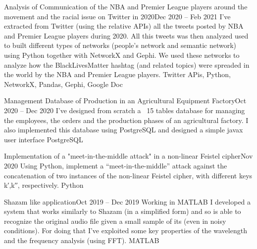 \begin{projects}
    	
    	
    \projectNoLink
    	{Analysis of Communication of the NBA and Premier League players around the movement and the racial issue on Twitter in 2020}{Dec 2020 – Feb 2021}
    	{I've extracted from Twitter (using the relative APIs) all the tweets posted by NBA and Premier League players during 2020. All this tweets was then analyzed used to built different types of networks (people's network and semantic network) using Python together with NetworkX and Gephi. We used these networks to analyze how the BlackLivesMatter hashtag (and related topics) were spreaded in the world by the NBA and Premier League players.}
    	{Twitter APis, Python, NetworkX, Pandas, Gephi, Google Doc}
    	
    \projectNoLink
    	{Management Database of Production in an Agricultural Equipment Factory}{Oct 2020 – Dec 2020}
    	{I've designed from scratch a ~15 tables database for managing the employees, the orders and the production phases of an agricultural factory. I also implemented this database using PostgreSQL and designed a simple javax user interface}
    	{PostgreSQL}
    	
    \projectNoLink
    	{Implementation of a "meet-in-the-middle attack" in a non-linear Feistel cipher}{Nov 2020}
    	{Using Python, implement a “meet-in-the-middle” attack against the concatenation of two instances of the non-linear Feistel cipher, with different keys k′,k′′, respectively.}
    	{Python}
    	
    \projectNoLink
    	{Shazam like application}{Oct 2019 – Dec 2019}
    	{Working in MATLAB I developed a system that works similarly to Shazam (in a simplified form) and so is able to recognize the original audio file given a small sample of its (even in noisy conditions). For doing that I've exploited some key properties of the wavelength and the frequency analysis (using FFT).}
    	{MATLAB}

\end{projects}